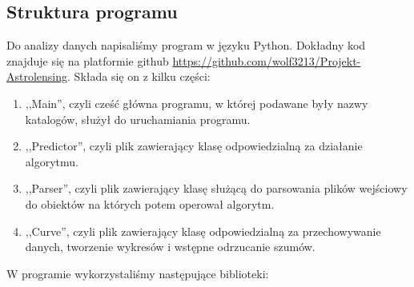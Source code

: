 \documentclass[a4paper,11pt]{article}
\newcommand{\ak}{\hspace{0.7 cm}}
\begin{document}
\subsection{Struktura programu}
\ak Do analizy danych napisaliśmy program w języku Python. Dokładny kod znajduje się na platformie github \url{https://github.com/wolf3213/Projekt-Astrolensing}. Składa się on z kilku części:
\begin{enumerate}
\item ,,Main'', czyli cześć główna programu, w której podawane były nazwy katalogów, służył do uruchamiania programu.
\item ,,Predictor'', czyli plik zawierający klasę odpowiedzialną za działanie algorytmu.
\item ,,Parser'', czyli plik zawierający klasę służącą do parsowania plików wejściowy do obiektów na których potem operował algorytm.
\item ,,Curve'', czyli plik zawierający klasę odpowiedzialną za przechowywanie danych, tworzenie wykresów i wstępne odrzucanie szumów.
\end{enumerate} 
W programie wykorzystaliśmy następujące biblioteki:
\end{document}
